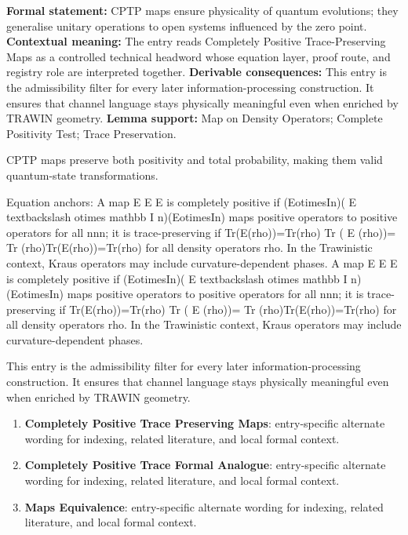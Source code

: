 \begingroup\footnotesize\setlength{\emergencystretch}{3em}\sloppy
\textbf{Formal statement:} CPTP maps ensure physicality of quantum evolutions; they generalise unitary operations to open systems influenced by the zero point. \textbf{Contextual meaning:} The entry reads Completely Positive Trace-Preserving Maps as a controlled technical headword whose equation layer, proof route, and registry role are interpreted together. \textbf{Derivable consequences:} This entry is the admissibility filter for every later information-processing construction. It ensures that channel language stays physically meaningful even when enriched by TRAWIN geometry. \textbf{Lemma support:} Map on Density Operators; Complete Positivity Test; Trace Preservation.\par
\endgroup

CPTP maps preserve both positivity and total probability, making them valid quantum-state transformations.

Equation anchors: A map E E E is completely positive if (EotimesIn)( E textbackslash otimes mathbb I n)(EotimesIn) maps positive operators to positive operators for all nnn; it is trace-preserving if Tr(E(rho))=Tr(rho) Tr ( E (rho))= Tr (rho)Tr(E(rho))=Tr(rho) for all density operators rho. In the Trawinistic context, Kraus operators may include curvature-dependent phases. A map E E E is completely positive if (EotimesIn)( E textbackslash otimes mathbb I n)(EotimesIn) maps positive operators to positive operators for all nnn; it is trace-preserving if Tr(E(rho))=Tr(rho) Tr ( E (rho))= Tr (rho)Tr(E(rho))=Tr(rho) for all density operators rho. In the Trawinistic context, Kraus operators may include curvature-dependent phases.

This entry is the admissibility filter for every later information-processing construction. It ensures that channel language stays physically meaningful even when enriched by TRAWIN geometry.
\endgroup

\begingroup\footnotesize\sloppy
\begin{enumerate}[leftmargin=1.35em,itemsep=1pt,topsep=1pt,parsep=0pt]
\item \textbf{Completely Positive Trace Preserving Maps}: entry-specific alternate wording for indexing, related literature, and local formal context.
\item \textbf{Completely Positive Trace Formal Analogue}: entry-specific alternate wording for indexing, related literature, and local formal context.
\item \textbf{Maps Equivalence}: entry-specific alternate wording for indexing, related literature, and local formal context.
\end{enumerate}
\endgroup

